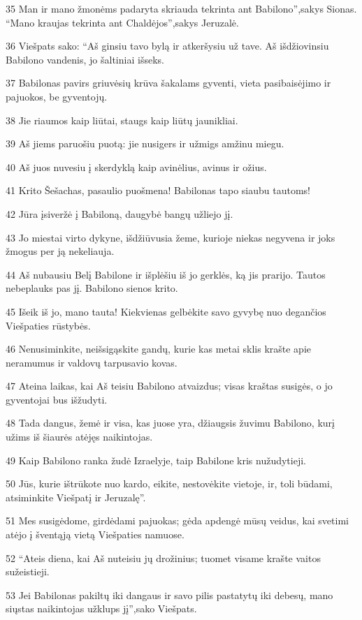 \par 35 Man ir mano žmonėms padaryta skriauda tekrinta ant Babilono”,­sakys Sionas. “Mano kraujas tekrinta ant Chaldėjos”,­sakys Jeruzalė. 
\par 36 Viešpats sako: “Aš ginsiu tavo bylą ir atkeršysiu už tave. Aš išdžiovinsiu Babilono vandenis, jo šaltiniai išseks. 
\par 37 Babilonas pavirs griuvėsių krūva šakalams gyventi, vieta pasibaisėjimo ir pajuokos, be gyventojų. 
\par 38 Jie riaumos kaip liūtai, staugs kaip liūtų jaunikliai. 
\par 39 Aš jiems paruošiu puotą: jie nusigers ir užmigs amžinu miegu. 
\par 40 Aš juos nuvesiu į skerdyklą kaip avinėlius, avinus ir ožius. 
\par 41 Krito Šešachas, pasaulio puošmena! Babilonas tapo siaubu tautoms! 
\par 42 Jūra įsiveržė į Babiloną, daugybė bangų užliejo jį. 
\par 43 Jo miestai virto dykyne, išdžiūvusia žeme, kurioje niekas negyvena ir joks žmogus per ją nekeliauja. 
\par 44 Aš nubausiu Belį Babilone ir išplėšiu iš jo gerklės, ką jis prarijo. Tautos nebeplauks pas jį. Babilono sienos krito. 
\par 45 Išeik iš jo, mano tauta! Kiekvienas gelbėkite savo gyvybę nuo degančios Viešpaties rūstybės. 
\par 46 Nenusiminkite, neišsigąskite gandų, kurie kas metai sklis krašte apie neramumus ir valdovų tarpusavio kovas. 
\par 47 Ateina laikas, kai Aš teisiu Babilono atvaizdus; visas kraštas susigės, o jo gyventojai bus išžudyti. 
\par 48 Tada dangus, žemė ir visa, kas juose yra, džiaugsis žuvimu Babilono, kurį užims iš šiaurės atėjęs naikintojas. 
\par 49 Kaip Babilono ranka žudė Izraelyje, taip Babilone kris nužudytieji. 
\par 50 Jūs, kurie ištrūkote nuo kardo, eikite, nestovėkite vietoje, ir, toli būdami, atsiminkite Viešpatį ir Jeruzalę”. 
\par 51 Mes susigėdome, girdėdami pajuokas; gėda apdengė mūsų veidus, kai svetimi atėjo į šventąją vietą Viešpaties namuose. 
\par 52 “Ateis diena, kai Aš nuteisiu jų drožinius; tuomet visame krašte vaitos sužeistieji. 
\par 53 Jei Babilonas pakiltų iki dangaus ir savo pilis pastatytų iki debesų, mano siųstas naikintojas užklups jį”,­sako Viešpats. 

